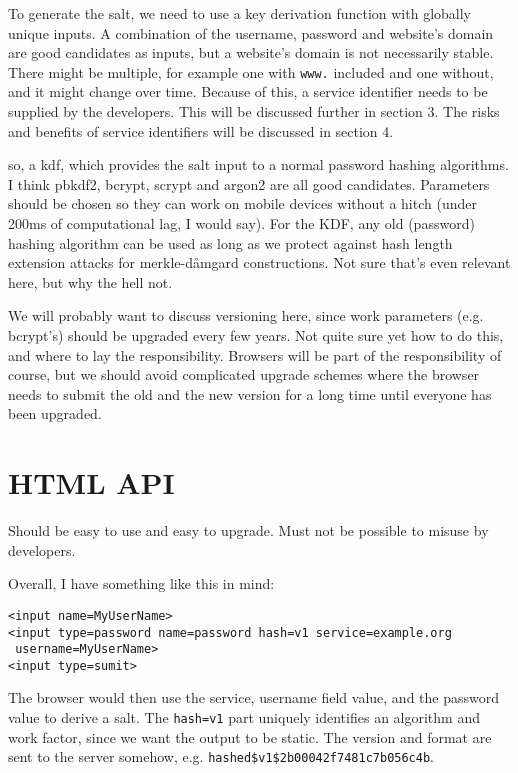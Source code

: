 \documentclass{paper}
\newcommand{\code}[1]{\texttt{\colorbox{gray!11}{#1}}}
\begin{document}
To generate the salt, we need to use a key derivation function with globally unique inputs.
A combination of the username, password and website's domain are good candidates as inputs,
but a website's domain is not necessarily stable. There might be multiple, for example one
with \code{www.} included and one without, and it might change over time. Because of this, a
service identifier needs to be supplied by the developers. This will be discussed further in
section 3. The risks and benefits of service identifiers will be discussed in section 4.

so, a kdf, which provides the salt input to a normal password hashing algorithms. I think
pbkdf2, bcrypt, scrypt and argon2 are all good candidates. Parameters should be chosen so
they can work on mobile devices without a hitch (under 200ms of computational lag, I would
say). For the KDF, any old (password) hashing algorithm can be used as long as we protect
against hash length extension attacks for merkle-dåmgard constructions. Not sure that's even
relevant here, but why the hell not.

We will probably want to discuss versioning here, since work parameters (e.g. bcrypt's)
should be upgraded every few years. Not quite sure yet how to do this, and where to lay the
responsibility. Browsers will be part of the responsibility of course, but we should avoid
complicated upgrade schemes where the browser needs to submit the old and the new version for
a long time until everyone has been upgraded.

\section{HTML API}

Should be easy to use and easy to upgrade. Must not be possible to misuse by developers.

Overall, I have something like this in mind:

\code{<input name=MyUserName>} \\
\code{<input type=password name=password hash=v1 service=example.org} \\
\code{ username=MyUserName>} \\
\code{<input type=sumit>}

The browser would then use the service, username field value, and the password value to
derive a salt. The \code{hash=v1} part uniquely identifies an algorithm and work factor,
since we want the output to be static. The version and format are sent to the server somehow,
e.g. \code{hashed\$v1\$2b00042f7481c7b056c4b}.
\end{document}
